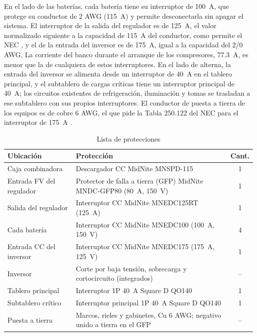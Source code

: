 En el lado de las baterías, cada batería tiene su interruptor de \SI{100}{A}, que protege su conductor de 2 AWG (\SI{115}{A}) y permite desconectarla sin apagar el sistema. El interruptor de la salida del regulador es de \SI{125}{A}, el valor normalizado siguiente a la capacidad de \SI{115}{A} del conductor, como permite el NEC \cite{nec2014}, y el de la entrada del inversor es de \SI{175}{A}, igual a la capacidad del 2/0 AWG. La corriente del banco durante el arranque de los compresores, \SI{77.3}{A}, es menor que la de cualquiera de estos interruptores. En el lado de alterna, la entrada del inversor se alimenta desde un interruptor de \SI{40}{A} en el tablero principal, y el subtablero de cargas críticas tiene un interruptor principal de \SI{40}{A}; los circuitos existentes de refrigeración, iluminación y tomas se trasladan a ese subtablero con sus propios interruptores. El conductor de puesta a tierra de los equipos es de cobre 6 AWG, el que pide la Tabla 250.122 del NEC para el interruptor de \SI{175}{A} \cite{nec2014}.

\begin{table}[!htb]
\caption{Lista de protecciones}
\label{tab:protecciones}
\centering
\footnotesize
\setlength{\tabcolsep}{3pt}
\begin{tabular}{l l c}
\toprule
Ubicación & Protección & Cant. \\
\midrule
Caja combinadora & Descargador CC MidNite MNSPD-115 & 1 \\
Entrada FV del regulador & Protector de falla a tierra (GFP) MidNite MNDC-GFP80 (\SI{80}{A}, \SI{150}{V}) & 1 \\
Salida del regulador & Interruptor CC MidNite MNEDC125RT (\SI{125}{A}) & 1 \\
Cada batería & Interruptor CC MidNite MNEDC100 (\SI{100}{A}, \SI{150}{V}) & 4 \\
Entrada CC del inversor & Interruptor CC MidNite MNEDC175 (\SI{175}{A}, \SI{125}{V}) & 1 \\
Inversor & Corte por baja tensión, sobrecarga y cortocircuito (integrados) & -- \\
Tablero principal & Interruptor 1P \SI{40}{A} Square D QO140 & 1 \\
Subtablero crítico & Interruptor principal 1P \SI{40}{A} Square D QO140 & 1 \\
Puesta a tierra & Marcos, rieles y gabinetes, Cu 6 AWG; negativo unido a tierra en el GFP & -- \\
\bottomrule
\end{tabular}
\end{table}

